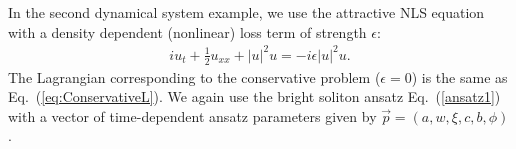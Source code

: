In the second dynamical system example, we use the attractive NLS equation with a density dependent (nonlinear) loss term of strength $\epsilon$:
\begin{align}
iu_t + \frac{1}{2} u_{xx} + |u|^2 u = -i  \epsilon  |u|^2 u. 
\label{eq:NLSDD}
\end{align}
The Lagrangian corresponding to the conservative problem ($\epsilon = 0$) is the same as Eq.~(\ref{eq:ConservativeL}).
We again use the bright soliton ansatz Eq.~(\ref{ansatz1})
with a vector of time-dependent ansatz parameters given by $\vec{p} = (a, w, \xi, c, b, \phi)$.

